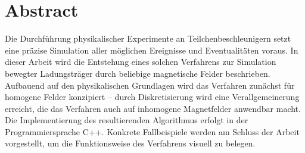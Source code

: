 \chapter*{Abstract}
\thispagestyle{empty}
Die Durchf\"uhrung physikalischer Experimente an Teilchenbeschleunigern setzt eine pr\"azise Simulation
aller m\"oglichen Ereignisse und Eventualit\"aten voraus. In dieser Arbeit wird die Entstehung eines solchen Verfahrens zur Simulation
bewegter Ladungstr\"ager durch beliebige magnetische Felder beschrieben. Aufbauend auf den physikalischen Grundlagen
wird das Verfahren zun\"achst f\"ur homogene Felder konzipiert -- durch Diskretisierung wird eine Verallgemeinerung erreicht,
die das Verfahren auch auf inhomogene Magnetfelder anwendbar macht. Die Implementierung des resultierenden Algorithmus erfolgt
in der Programmiersprache C++. Konkrete Fallbeispiele werden am Schluss der
Arbeit vorgestellt, um die Funktionsweise des Verfahrens visuell zu belegen.
